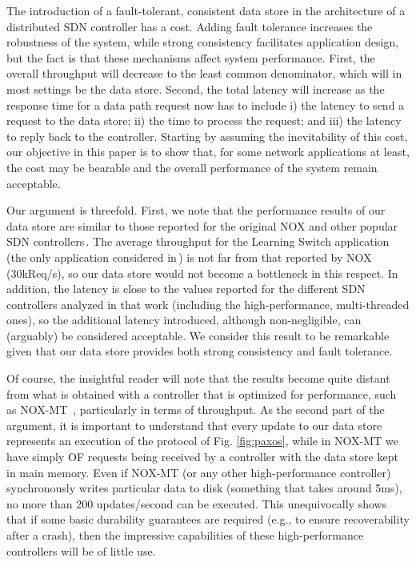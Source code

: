 
The introduction of a fault-tolerant, consistent data store in the architecture of a distributed SDN controller has a cost.
Adding fault tolerance increases the robustness of the system, while strong consistency facilitates application design, but the fact is that these mechanisms affect system performance.
First, the overall throughput will decrease to the least common denominator, which will in most settings be the data store.
Second, the total latency will increase as the response time for a data path request now has to include i) the latency to send a request to the data store; ii) the time to process the request; and iii) the latency to reply back to the controller.
Starting by assuming the inevitability of this cost, our objective in this paper is to show that, for some network applications at least, the cost may be bearable and the overall performance of the system remain acceptable.

Our argument is threefold.
First, we note that the performance results of our data store are similar to those reported for the original NOX and other popular SDN controllers\,\cite{Tootoonchian:2012:CPS:2228283.2228297}.
The average throughput for the Learning Switch application (the only application considered in\,\cite{Tootoonchian:2012:CPS:2228283.2228297}) is not far from that reported by NOX (30kReq/s), so our data store would not become a bottleneck in this respect.
In addition, the latency is close to the values reported for the different SDN controllers analyzed in that work (including the high-performance, multi-threaded ones), so the additional latency introduced, although non-negligible, can (arguably) be considered acceptable.
We consider this result to be remarkable given that our data store provides both strong consistency and fault tolerance.

Of course, the insightful reader will note that the results become quite distant from what is obtained with a controller that is optimized for performance, such as NOX-MT~\cite{Tootoonchian:2012:CPS:2228283.2228297}, particularly in terms of throughput.
As the second part of the argument, it is important to understand that every update to our data store represents an execution of the protocol of Fig. \ref{fig:paxos}, while in NOX-MT we have simply OF requests being received by a controller with the data store kept in main memory.
Even if NOX-MT (or any other high-performance controller) synchronously writes particular data to disk (something that takes around 5ms), no more than 200 updates/second can be executed.
This unequivocally shows that if some basic durability guarantees are required (e.g., to ensure recoverability after a crash), then the impressive capabilities of these high-performance controllers will be of little use.


